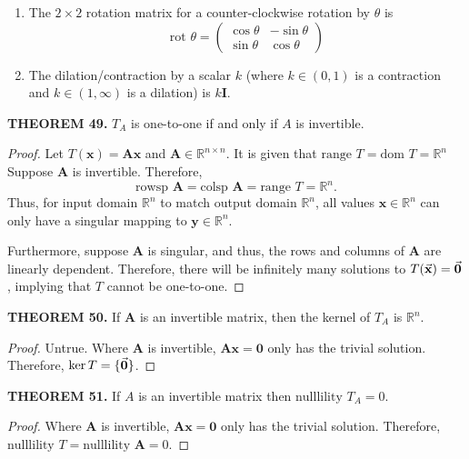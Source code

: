 \documentclass[12pt]{article}
\newcommand{\mat}[1]{\mathbf{#1}}
\newcommand{\theorem}[2]{\textbf{THEOREM #1.} #2}
\newcommand{\nullility}{\text{nulllility }}
\newcommand{\rowsp}{\text{rowsp }}
\newcommand{\colsp}{\text{colsp }}
\newcommand{\rot}{\text{rot }}
\newcommand{\dom}{\text{dom }}
\newcommand{\range}{\text{range }}
\begin{document}
\begin{enumerate}
\begin{enumerate}
\item The $2 \times 2$ rotation matrix for a counter-clockwise rotation by $\theta$ is
\begin{equation}
\rot \theta = 
\begin{pmatrix}
\cos \theta & -\sin \theta \\
\sin \theta & \cos \theta
\end{pmatrix}
\end{equation}
\item The dilation/contraction by a scalar $k$ (where $k \in (0,1)$ is a contraction and $k \in (1,\infty)$ is a dilation) is $k\mat{I}$.
\end{enumerate}
\end{enumerate}

\theorem{49}{$T_{A}$ is one-to-one if and only if $A$ is invertible.}

\begin{proof}
Let $T(\mat{x}) = \mat{Ax}$ and $\mat{A} \in \mathbb{R}^{n \times n}$. It is given that $\range T = \dom T = \mathbb{R}^{n}$ Suppose $\mat{A}$ is invertible. Therefore, 
\begin{equation*}
\rowsp \mat{A} = \colsp \mat{A} = \range T = \mathbb{R}^{n}.
\end{equation*}
Thus, for input domain $\mathbb{R}^{n}$ to match output domain $\mathbb{R}^{n}$, all values $\mat{x} \in \mathbb{R}^{n}$ can only have a singular mapping to $\mat{y} \in \mathbb{R}^{n}$. 

Furthermore, suppose $\mat{A}$ is singular, and thus, the rows and columns of $\mat{A}$ are linearly dependent. Therefore, there will be infinitely many solutions to $T(\va{x}) = \va{0}$, implying that $T$ cannot be one-to-one. 
\end{proof}

\theorem{50}{If $\mat{A}$ is an invertible matrix, then the kernel of $T_{A}$ is $\mathbb{R}^{n}$.}

\begin{proof}
Untrue. Where $\mat{A}$ is invertible, $\mat{Ax=0}$ only has the trivial solution. Therefore, $\ker T = \{ \va{0} \}$.
\end{proof}

\theorem{51}{If $A$ is an invertible matrix then $\nullility T_{A} = 0$.}

\begin{proof}
Where $\mat{A}$ is invertible, $\mat{Ax=0}$ only has the trivial solution. Therefore, $\nullility T = \nullility \mat{A} = 0$.
\end{proof}
\end{document}
